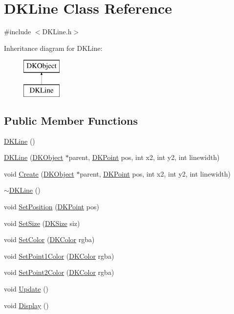 \hypertarget{class_d_k_line}{\section{D\-K\-Line Class Reference}
\label{class_d_k_line}
}


{\ttfamily \#include $<$D\-K\-Line.\-h$>$}

Inheritance diagram for D\-K\-Line\-:\begin{figure}[H]
\begin{center}
\leavevmode
\includegraphics[height=2.000000cm]{class_d_k_line}
\end{center}
\end{figure}
\subsection*{Public Member Functions}
\begin{DoxyCompactItemize}
\item 
\hyperlink{class_d_k_line_a312310e5020c18c8d0b0f9f2d5e4f79c}{D\-K\-Line} ()
\item 
\hyperlink{class_d_k_line_a539e1f497f2c5c8c7675d9b0bab8e603}{D\-K\-Line} (\hyperlink{class_d_k_object}{D\-K\-Object} $\ast$parent, \hyperlink{_d_k_axis_8h_a0ca1f005fbb936f8e7a7f2433591f418}{D\-K\-Point} pos, int x2, int y2, int linewidth)
\item 
void \hyperlink{class_d_k_line_a6a2b51cfa8fdd1f64d42347d112f15af}{Create} (\hyperlink{class_d_k_object}{D\-K\-Object} $\ast$parent, \hyperlink{_d_k_axis_8h_a0ca1f005fbb936f8e7a7f2433591f418}{D\-K\-Point} pos, int x2, int y2, int linewidth)
\item 
\hyperlink{class_d_k_line_add88f493ddfd7e4f438f2c704afc14a5}{$\sim$\-D\-K\-Line} ()
\item 
void \hyperlink{class_d_k_line_aadc7c57e9dd55c89b999d4de4acaed38}{Set\-Position} (\hyperlink{_d_k_axis_8h_a0ca1f005fbb936f8e7a7f2433591f418}{D\-K\-Point} pos)
\item 
void \hyperlink{class_d_k_line_a445498e6766cccddf7ab93b9afa0e1e0}{Set\-Size} (\hyperlink{_d_k_axis_8h_aaa25a8c7cbf504fffdb8a4208ff7a731}{D\-K\-Size} siz)
\item 
void \hyperlink{class_d_k_line_aa522d13d6c822e917b60d7f1039fea73}{Set\-Color} (\hyperlink{class_d_k_color}{D\-K\-Color} rgba)
\item 
void \hyperlink{class_d_k_line_a53a34203c7b465eefdf7258a1af7187e}{Set\-Point1\-Color} (\hyperlink{class_d_k_color}{D\-K\-Color} rgba)
\item 
void \hyperlink{class_d_k_line_af4c676bf8d22e90a61c6b48da3133252}{Set\-Point2\-Color} (\hyperlink{class_d_k_color}{D\-K\-Color} rgba)
\item 
void \hyperlink{class_d_k_line_ab2b36575e0b533c42acf297fb133a637}{Update} ()
\item 
void \hyperlink{class_d_k_line_a2dcd93c348ff1ae1ba7fa363b491cb30}{Display} ()
\end{DoxyCompactItemize}

